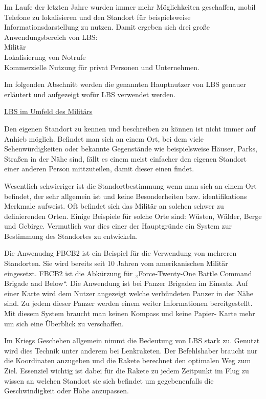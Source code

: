 Im Laufe der letzten Jahre wurden immer mehr Möglichkeiten geschaffen, mobil Telefone zu lokalisieren und den Standort für beispielsweise Informationsdarstellung zu nutzen. Damit ergeben sich drei große Anwendungsbereich von LBS:
\\Militär
\\Lokalisierung von Notrufe
\\Kommerzielle Nutzung für privat Personen und Unternehmen.

Im folgenden Abschnitt werden die genannten Hauptnutzer von LBS genauer erläutert und aufgezeigt wofür LBS verwendet werden.


\underline{LBS im Umfeld des Militärs}

Den eigenen Standort zu kennen und beschreiben zu können ist nicht immer auf Anhieb möglich. Befindet man sich an einem Ort, bei dem viele Sehenwürdigkeiten oder bekannte Gegenstände wie beispielsweise Häuser, Parks, Straßen in der Nähe sind, fällt es einem meist einfacher den eigenen Standort einer anderen Person mittzuteilen, damit dieser einen findet.

Wesentlich schwieriger ist die Standortbestimmung wenn man sich an einem Ort befindet, der sehr allgemein ist und keine Besonderheiten bzw. identifikations Merkmale aufweist. Oft befindet sich das Militär an solchen schwer zu definierenden Orten. Einige Beispiele für solche Orte sind: Wüsten, Wälder, Berge und Gebirge. Vermutlich war dies einer der Hauptgründe ein System zur Bestimmung des Standortes zu entwickeln. 

Die Anwenudng FBCB2 ist ein Beispiel für die Verwendung von mehreren Standorten. Sie wird bereits seit 10 Jahren vom amerikanischen Militär eingesetzt. FBCB2 ist die Abkürzung für „Force-Twenty-One Battle Command Brigade and Below“. Die Anwendung ist bei Panzer Brigaden im Einsatz. Auf einer Karte wird dem Nutzer angezeigt welche verbündeten Panzer in der Nähe sind. Zu jedem dieser Panzer werden einem weiter Informationen bereitgestellt. Mit diesem System braucht man keinen Kompass und keine Papier- Karte mehr um sich eine Überblick zu verschaffen. 

Im Kriegs Geschehen allgemein nimmt die Bedeutung von LBS stark zu. Genutzt wird dies Technik unter anderem bei Lenkraketen. Der Befehlshaber braucht nur die Koordinaten anzugeben und die Rakete berechnet den optimalen Weg zum Ziel. Essenziel wichtig ist dabei für die Rakete zu jedem Zeitpunkt im Flug zu wissen an welchen Standort sie sich befindet um gegebenenfalls die Geschwindigkeit oder Höhe anzupassen. 

